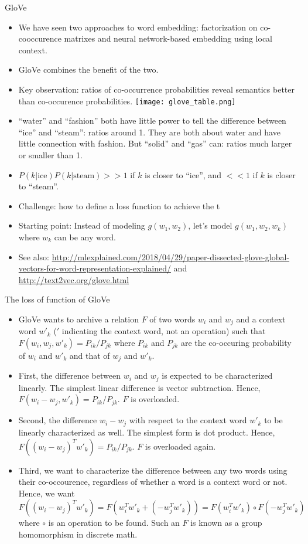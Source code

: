 \documentclass[11pt,handout]{beamer}
\begin{document}
\begin{frame}{GloVe}
\begin{itemize}[<+->]
 \item We have seen two approaches to word embedding: factorization on co-cooccurence matrixes and neural network-based embedding using local context. 
 \item GloVe combines the benefit of the two. 
 \item Key observation: ratios of co-occurrence probabilities reveal semantics better  than co-occurence probabilities. 
 \texttt{[image: glove\_table.png]}
 \item ``water'' and ``fashion'' both have little power to tell the difference between ``ice'' and ``steam'': ratios around 1. They are both about water and have little connection with fashion. But ``solid'' and ``gas'' can: ratios much larger or smaller than 1. 
 \item $P(k|\text{ice})P(k|\text{steam}) >> 1 $ if $k$ is closer to ``ice'', and $<<1$ if $k$ is closer to ``steam''. 
 \item Challenge: how to define a loss function to achieve the t
 \item Starting point: Instead of modeling $g(w_1, w_2)$, let's model $g(w_1, w_2, w_k)$ where $w_k$ can be any word. 
 \item See also: \url{http://mlexplained.com/2018/04/29/paper-dissected-glove-global-vectors-for-word-representation-explained/} and \url{http://text2vec.org/glove.html}
\end{itemize}
\end{frame}
 
\begin{frame}{The loss of function of GloVe}
\begin{itemize}[<+->]
 \item GloVe wants to archive a relation $F$ of two words $w_i$ and $w_j$ and a context word $w'_k$ ($'$ indicating the context word, not an operation) such that $F(w_i, w_j, w'_k) = P_{ik} / P_{jk}$ where $P_{ik}$ and $P_{jk}$ are the co-occuring probability of $w_i$ and $w'_k$ and that of $w_j$ and $w'_k$. 
 \item First, the difference between $w_i$ and $w_j$ is expected to be characterized linearly. The simplest linear difference is vector subtraction.  Hence, 
   $F(  w_i-w_j, w'_k) = P_{ik} / P_{jk}$. $F$ is overloaded. 
 \item Second, the difference $w_i-w_j$ with respect to the context word $w'_k$ to be linearly characterized as well. The simplest form is dot product. Hence, $F(  (w_i-w_j)^T w'_k) = P_{ik} / P_{jk}$. $F$ is overloaded again. 
 \item Third, we want to characterize the difference between any two words using their co-occourence, regardless of whether a word is a context word or not. Hence, we want $F((w_i-w_j)^T w'_k) = F(w_i^T w'_k + (-w_j^Tw'_k)) = F(w_i^T w'_k) \circ F(-w_j^T w'_k)$ where $\circ$ is an operation to be found. Such an $F$ is known as a group homomorphism in discrete math.
\end{itemize}
\end{frame}
\end{document}
